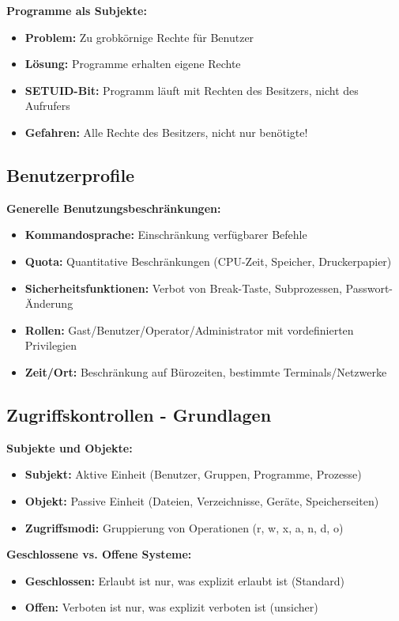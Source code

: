 \documentclass[9pt,a4paper]{extarticle}
\begin{document}
\begin{multicols*}{2}
\textbf{Programme als Subjekte:}
\begin{itemize}
\item \textbf{Problem:} Zu grobkörnige Rechte für Benutzer
\item \textbf{Lösung:} Programme erhalten eigene Rechte
\item \textbf{SETUID-Bit:} Programm läuft mit Rechten des Besitzers, nicht des Aufrufers
\item \textbf{Gefahren:} Alle Rechte des Besitzers, nicht nur benötigte!
\end{itemize}

\subsection{Benutzerprofile}
\textbf{Generelle Benutzungsbeschränkungen:}
\begin{itemize}
\item \textbf{Kommandosprache:} Einschränkung verfügbarer Befehle
\item \textbf{Quota:} Quantitative Beschränkungen (CPU-Zeit, Speicher, Druckerpapier)
\item \textbf{Sicherheitsfunktionen:} Verbot von Break-Taste, Subprozessen, Passwort-Änderung
\item \textbf{Rollen:} Gast/Benutzer/Operator/Administrator mit vordefinierten Privilegien
\item \textbf{Zeit/Ort:} Beschränkung auf Bürozeiten, bestimmte Terminals/Netzwerke
\end{itemize}

\subsection{Zugriffskontrollen - Grundlagen}
\textbf{Subjekte und Objekte:}
\begin{itemize}
\item \textbf{Subjekt:} Aktive Einheit (Benutzer, Gruppen, Programme, Prozesse)
\item \textbf{Objekt:} Passive Einheit (Dateien, Verzeichnisse, Geräte, Speicherseiten)
\item \textbf{Zugriffsmodi:} Gruppierung von Operationen (r, w, x, a, n, d, o)
\end{itemize}

\textbf{Geschlossene vs. Offene Systeme:}
\begin{itemize}
\item \textbf{Geschlossen:} Erlaubt ist nur, was explizit erlaubt ist (Standard)
\item \textbf{Offen:} Verboten ist nur, was explizit verboten ist (unsicher)
\end{itemize}


\end{multicols*}
\end{document}
